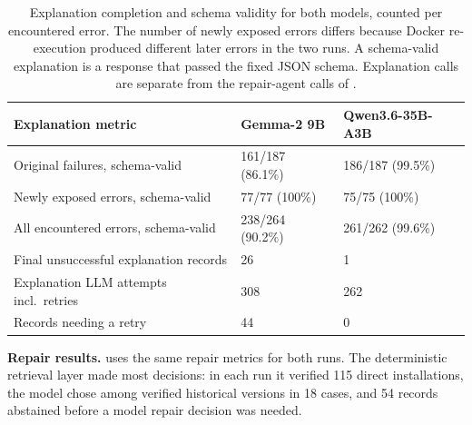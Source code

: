 \begin{table}[htbp]
  \centering
  \small
  \begin{tabular}{|p{5.3cm}|p{3.3cm}|p{3.3cm}|}
    \hline
    \textbf{Explanation metric} & \textbf{Gemma-2 9B} & \textbf{Qwen3.6-35B-A3B} \\
    \hline
    Original failures, schema-valid & 161/187 (86.1\%) & 186/187 (99.5\%) \\
    \hline
    Newly exposed errors, schema-valid & 77/77 (100\%) & 75/75 (100\%) \\
    \hline
    All encountered errors, schema-valid & 238/264 (90.2\%) & 261/262 (99.6\%) \\
    \hline
    Final unsuccessful explanation records & 26 & 1 \\
    \hline
    Explanation LLM attempts incl.\ retries & 308 & 262 \\
    \hline
    Records needing a retry & 44 & 0 \\
    \hline
  \end{tabular}
  \caption{Explanation completion and schema validity for both models,
  counted per encountered error. The number of newly exposed errors differs
  because Docker re-execution produced different later errors in the two runs.
  A schema-valid explanation is a response that passed the fixed JSON schema.
  Explanation calls are separate from the repair-agent calls of
  .}
  \label{tab:v-model-sensitivity-explanation}
\end{table}

\textbf{Repair results.}  uses the same repair
metrics for both runs. The deterministic retrieval layer made most decisions:
in each run it verified 115 direct installations, the model chose among
verified historical versions in 18 cases, and 54 records abstained before a
model repair decision was needed.

